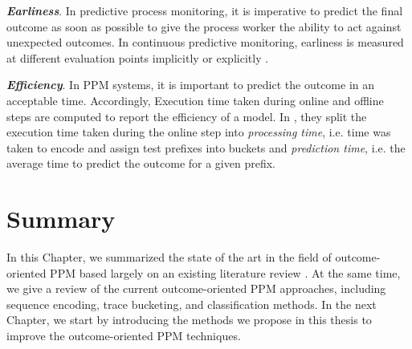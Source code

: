\textbf{\textit{Earliness}}. In predictive process monitoring, it is imperative to predict the final outcome as soon as possible to give the process worker the ability to act against unexpected outcomes. In continuous predictive monitoring, earliness is measured at different evaluation points implicitly or explicitly \cite{leontjeva2016complex}. 


\textbf{\textit{Efficiency}}. In PPM systems, it is important to predict the outcome in an acceptable time. Accordingly, Execution time taken during online and offline steps are computed to report the efficiency of a model. In \cite{di2017clustering}, they split the execution time taken during the online step into \textit{processing time}, i.e. time was taken to encode and assign test prefixes into buckets and \textit{prediction time}, i.e. the average time to predict the outcome for a given prefix.  


\section{Summary} \label{s3}

In this Chapter, we summarized the state of the art in the field of outcome-oriented PPM based largely on an existing literature review \cite{teinemaa2019outcome}. At the same time, we give a review of the current outcome-oriented PPM approaches, including sequence encoding, trace bucketing, and classification methods. In the next Chapter, we start by introducing the methods we propose in this thesis to improve the outcome-oriented PPM techniques. 









